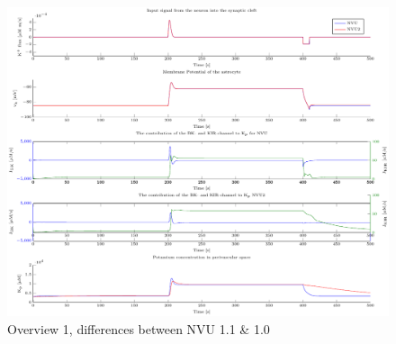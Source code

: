 \begin{landscape}
	
	\begin{figure}[h!]
		\centering
		\tiny 
		\setlength\figureheight{2 cm} 
		\setlength\figurewidth{18 cm}
		\includegraphics{figures/fig1_NVU_12.pdf}
		\caption{Overview 1, differences between NVU 1.1  \& 1.0}
		\label{fig:NVU10a}
	\end{figure}
	

\end{landscape}
